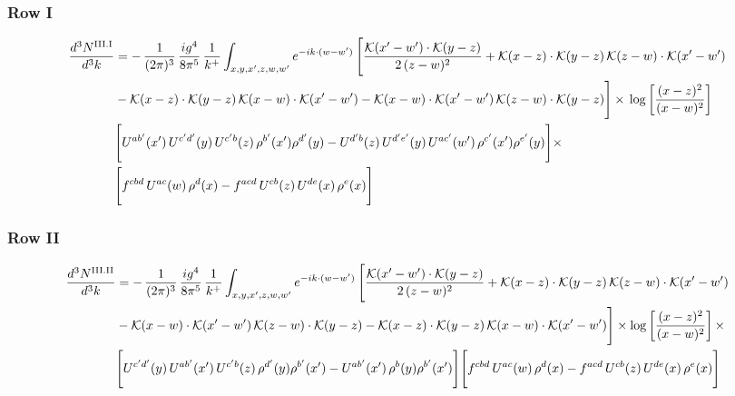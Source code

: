 \documentclass[9pt]{article}
\numberwithin{equation}{section}
\begin{document}
\subsubsection*{Row I}
{\color{green}\begin{align}
\frac{d^{3}N^{\rm III.I}}{d^{3}k} & = -\,\frac{1}{(2\pi)^{3}}\,\frac{ig^{4}}{8\pi^{5}}\,\frac{1}{k^{+}}\int_{x,y,x',z,w,w'} e^{-ik\cdot(w-w')}\,\Bigg[\frac{\mathcal{K}(x'-w')\cdot\mathcal{K}(y-z)}{2\,(z-w)^{2}}+\mathcal{K}(x-z)\cdot\mathcal{K}(y-z)\,\mathcal{K}(z-w)\cdot\mathcal{K}(x'-w')\notag \\
& -\mathcal{K}(x-z)\cdot\mathcal{K}(y-z)\,\mathcal{K}(x-w)\cdot\mathcal{K}(x'-w')-\mathcal{K}(x-w)\cdot\mathcal{K}(x'-w')\,\mathcal{K}(z-w)\cdot\mathcal{K}(y-z)\Bigg]\times\, \log\left[\frac{(x-z)^{2}}{(x-w)^{2}}\right]\notag \\
& \Bigg[U^{ab'}(x')\,U^{c'd'}(y)\,U^{c'b}(z)\,\rho^{b'}(x')\rho^{d'}(y)-U^{d'b}(z)\,U^{d'e'}(y)\,U^{ac'}(w')\,\rho^{c'}(x')\rho^{e'}(y)\Bigg]\times\notag \\ & \Bigg[f^{cbd}\,U^{ac}(w)\,\rho^{d}(x)-f^{acd}\, U^{cb}(z)\,U^{de}(x)\,\rho^{e}(x)\Bigg]\label{eq:B-III1}
\end{align}}
\subsubsection*{Row II}
\begin{align}
\frac{d^{3}N^{\rm III.II}}{d^{3}k} & = -\,\frac{1}{(2\pi)^{3}}\,\frac{ig^{4}}{8\pi^{5}}\,\frac{1}{k^{+}}\int_{x,y,x',z,w,w'} e^{-ik\cdot(w-w')}\,\Bigg[\frac{\mathcal{K}(x'-w')\cdot\mathcal{K}(y-z)}{2\,(z-w)^{2}} +\mathcal{K}(x-z)\cdot\mathcal{K}(y-z)\,\mathcal{K}(z-w)\cdot\mathcal{K}(x'-w')\notag \\ & -\mathcal{K}(x-w)\cdot\mathcal{K}(x'-w')\,\mathcal{K}(z-w)\cdot\mathcal{K}(y-z)-\mathcal{K}(x-z)\cdot\mathcal{K}(y-z)\,\mathcal{K}(x-w)\cdot\mathcal{K}(x'-w')\Bigg]\times\log\left[\frac{(x-z)^{2}}{(x-w)^{2}}\right]\times\notag \\
&\Bigg[U^{c'd'}(y)\,U^{ab'}(x')\,U^{c'b}(z)\,\rho^{d'}(y)\rho^{b'}(x')-U^{ab'}(x')\,\rho^{b}(y)\rho^{b'}(x')\Bigg]\Bigg[f^{cbd}\,U^{ac}(w)\,\rho^{d}(x)-f^{acd}\, U^{cb}(z)\,U^{de}(x)\,\rho^{e}(x)\Bigg]\label{eq:B-III2}
\end{align}
\end{document}
